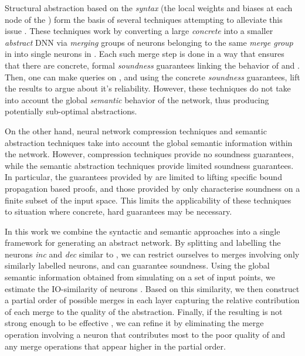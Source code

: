 Structural abstraction based on the \textit{syntax} (the local weights and biases at each
node of the \dnn) form the basis of several techniques attempting to alleviate
this issue \cite{cegar-nn, cegarette, cleverest-nn, conv-abs-gk}. These
techniques work by converting a large \textit{concrete} \dnn \cnc into a smaller
\textit{abstract} DNN \abs via \textit{merging} groups of neurons belonging to
the same \textit{merge group} in \cnc into single neurons in \abs. Each such
merge step is done in a way that ensures that there are concrete, formal
\textit{soundness} guarantees linking the behavior of \cnc and \abs. Then, one
can make queries on \abs, and using the concrete \textit{soundness} guarantees,
lift the results to \cnc argue about it's reliability. However, these techniques
do not take into account the global \textit{semantic} behavior of the network,
thus producing potentially sub-optimal abstractions. 

On the other hand, neural network compression techniques  and
semantic abstraction techniques \cite{deep-abstract, lin-comb-abs-jan} take into
account the global semantic information within the network. However,
compression techniques provide no soundness guarantees, while the semantic
abstraction techniques provide limited soundness guarantees. In particular, the
guarantees provided by \cite{deep-abstract} are limited to lifting specific
bound propagation based proofs, and those provided by \cite{lin-comb-abs-jan}
only characterise soundness on a finite subset of the input space. This limits the applicability
of these techniques to situation where concrete, hard guarantees may be
necessary.

In this work we combine the syntactic and semantic approaches into a single
framework for generating an abstract network. By splitting and labelling the
neurons \textit{inc} and \textit{dec} similar to \cite{cegar-nn}, we can
restrict ourselves to merges involving only similarly labelled neurons, and can
guarantee soundness. Using the global semantic information obtained from
simulating \cnc on a set of input points, we estimate the IO-similarity of
neurons . Based on this
similarity, we then construct a partial order of possible merges in each layer
capturing the relative contribution of each merge to the quality of the
abstraction. Finally, if the resulting \abs
is not strong  enough to be effective , we can refine it by eliminating the merge operation involving
a neuron that contributes most to the poor quality  of \abs and any merge operations that appear higher in the partial
order.

